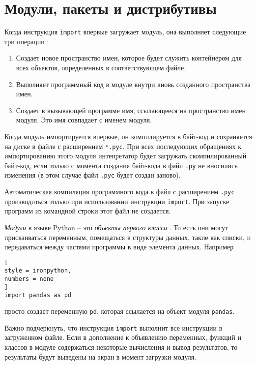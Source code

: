 \documentclass[%
	11pt,
	a4paper,
	utf8,
		]{article}
\begin{document}
\section{Модули, пакеты и дистрибутивы}

Когда инструкция \texttt{import} впервые загружает модуль, она выполняет следующие три операции \cite[]{beazley:python-2010}:
\begin{enumerate}
	\item Создает новое пространство имен, которое будет служить контейнером для всех объектов, определенных в соответствующем файле.
	
	\item Выполняет программный код в модуле внутри вновь созданного пространства имен.
	
	\item Создает в вызывающей программе имя, ссылающееся на пространство имен модуля. Это имя совпадает с именем модуля.
\end{enumerate}

Когда модуль импортируется впервые, он компилируется в байт-код и сохраняется на диске в файле с расширением \texttt{*.pyc}. При всех последующих обращениях к импортированию этого модуля интепретатор будет загружать скомпилированный байт-код, если только с момента создания байт-кода в файл \texttt{.py} не вносились изменения (в этом случае файл \texttt{.pyc} будет создан заново).

Автоматическая компиляция программного кода в файл с расширением \texttt{.pyc} производиться только при использовании инструкции \texttt{import}. При запуске программ из командной строки этот файл не создается.

\emph{Модули} в языке Python -- это \emph{объекты первого класса} \cite[]{beazley:python-2010}. То есть они могут присваиваться переменным, помещаться в структуры данных, такие как списки, и передаваться между частями программы в виде элемента данных. Например
\begin{lstlisting}[
style = ironpython,
numbers = none	
]
import pandas as pd
\end{lstlisting}
просто создает переменную \texttt{pd}, которая ссылается на объект модуля \texttt{pandas}.

Важно подчеркнуть, что инструкция \texttt{import} выполнит все инструкции в загруженном файле. Если в дополнение к объявлению переменных, функций и классов в модуле содержаться некоторые вычисления и вывод результатов, то результаты будут выведены на экран в момент загрузки модуля.
\end{document}
